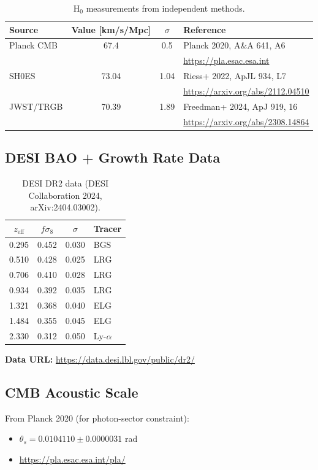 \documentclass[11pt]{article}
\begin{document}
\begin{table}[h]
\centering
\begin{tabular}{lccp{5cm}}
\toprule
Source & Value [km/s/Mpc] & $\sigma$ & Reference \\
\midrule
Planck CMB & 67.4 & 0.5 & Planck 2020, A\&A 641, A6 \\
 & & & \url{https://pla.esac.esa.int} \\
\midrule
SH0ES & 73.04 & 1.04 & Riess+ 2022, ApJL 934, L7 \\
 & & & \url{https://arxiv.org/abs/2112.04510} \\
\midrule
JWST/TRGB & 70.39 & 1.89 & Freedman+ 2024, ApJ 919, 16 \\
 & & & \url{https://arxiv.org/abs/2308.14864} \\
\bottomrule
\end{tabular}
\caption{H$_0$ measurements from independent methods.}
\end{table}

\subsection{DESI BAO + Growth Rate Data}

\begin{table}[h]
\centering
\begin{tabular}{cccp{4cm}}
\toprule
$z_{\text{eff}}$ & $f\sigma_8$ & $\sigma$ & Tracer \\
\midrule
0.295 & 0.452 & 0.030 & BGS \\
0.510 & 0.428 & 0.025 & LRG \\
0.706 & 0.410 & 0.028 & LRG \\
0.934 & 0.392 & 0.035 & LRG \\
1.321 & 0.368 & 0.040 & ELG \\
1.484 & 0.355 & 0.045 & ELG \\
2.330 & 0.312 & 0.050 & Ly-$\alpha$ \\
\bottomrule
\end{tabular}
\caption{DESI DR2 data (DESI Collaboration 2024, arXiv:2404.03002).}
\end{table}

\noindent\textbf{Data URL:} \url{https://data.desi.lbl.gov/public/dr2/}

\subsection{CMB Acoustic Scale}

From Planck 2020 (for photon-sector constraint):
\begin{itemize}
    \item $\theta_s = 0.0104110 \pm 0.0000031$ rad
    \item \url{https://pla.esac.esa.int/pla/}
\end{itemize}
\end{document}
